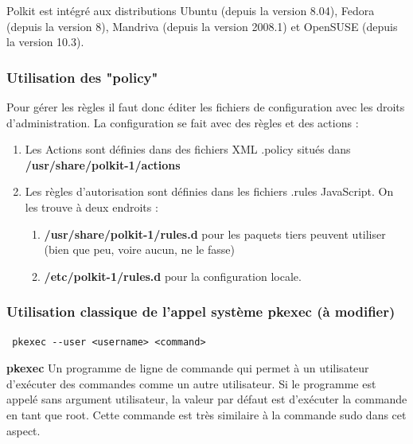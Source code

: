 \documentclass[12pt,a4paper]{article}
\begin{document}
\begin{flushleft}
\begin{flushleft}
                \item Polkit est intégré aux distributions Ubuntu (depuis la version 8.04), Fedora (depuis la version 8), Mandriva (depuis la version 2008.1) et OpenSUSE (depuis la version 10.3).
                \subsubsection{Utilisation des "policy"}
                \begin{flushleft}
                    \noindent Pour gérer les règles il faut donc éditer les fichiers de configuration avec les droits d'administration. La configuration se fait avec des règles et des actions :
                    \begin{enumerate}
                        \item Les Actions sont définies dans des fichiers XML .policy situés dans \textbf{/usr/share/polkit-1/actions} 
                        \item Les règles d'autorisation sont définies dans les fichiers .rules JavaScript. On les trouve à deux endroits : \cite{PartVMan11:online}
                        \begin{enumerate}
                            \item \textbf{/usr/share/polkit-1/rules.d} pour les paquets tiers peuvent utiliser (bien que peu, voire aucun, ne le fasse)
                            \item \textbf{/etc/polkit-1/rules.d} pour la configuration locale.
                        \end{enumerate}
                    \end{enumerate}
                \end{flushleft}
                \subsubsection{Utilisation classique de l'appel système pkexec (à modifier)}
                \begin{flushleft}
                    \begin{lstlisting}
 pkexec --user <username> <command>
                    \end{lstlisting}
                     \item \textbf{pkexec} Un programme de ligne de commande qui permet à un utilisateur d’exécuter des commandes comme un autre utilisateur. Si le programme est appelé sans argument utilisateur, la valeur par défaut est d’exécuter la commande en tant que root. Cette commande est très similaire à la commande sudo dans cet aspect. \cite{CVE2021425:online}
                \end{flushleft}

\end{flushleft}
\end{flushleft}
\end{document}
